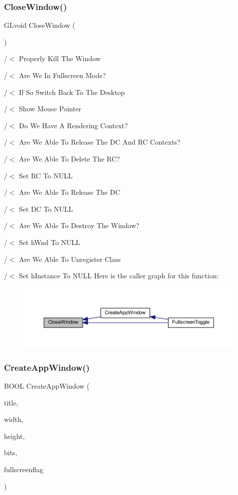 \subsubsection{Close\+Window()}
{\footnotesize\ttfamily G\+Lvoid Close\+Window (\begin{DoxyParamCaption}\item[{G\+Lvoid}]{ }\end{DoxyParamCaption})}



/$<$ Properly Kill The Window 

/$<$ Are We In Fullscreen Mode?

/$<$ If So Switch Back To The Desktop

/$<$ Show Mouse Pointer

/$<$ Do We Have A Rendering Context?

/$<$ Are We Able To Release The DC And RC Contexts?

/$<$ Are We Able To Delete The RC?

/$<$ Set RC To N\+U\+LL

/$<$ Are We Able To Release The DC

/$<$ Set DC To N\+U\+LL

/$<$ Are We Able To Destroy The Window?

/$<$ Set h\+Wnd To N\+U\+LL

/$<$ Are We Able To Unregister Class

/$<$ Set h\+Instance To N\+U\+LL Here is the caller graph for this function\+:\nopagebreak
\begin{figure}[H]
\begin{center}
\leavevmode
\includegraphics[width=350pt]{supportcode_8h_a4709a40ac779c9bbb341a15554eae549_icgraph}
\end{center}
\end{figure}
\mbox{\label{supportcode_8h_acd4be192aca2369a87f51d952150a77b}} 
\subsubsection{Create\+App\+Window()}
{\footnotesize\ttfamily B\+O\+OL Create\+App\+Window (\begin{DoxyParamCaption}\item[{const char $\ast$}]{title,  }\item[{int}]{width,  }\item[{int}]{height,  }\item[{int}]{bits,  }\item[{bool}]{fullscreenflag }\end{DoxyParamCaption})}

